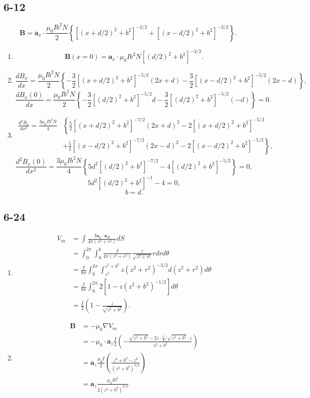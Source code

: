 \documentclass[11pt,a4paper]{article}
\begin{document}
\subsection{6-12}
$$\mathbf{B}=\mathbf{a}_x\cdot\frac{\mu_0Ib^2N}{2}\left\{[(x+d/2)^2+b^2]^{-3/2}+[(x-d/2)^2+b^2]^{-3/2}\right\}.$$
\begin{enumerate}[label=\alph*)]
\item
$$\mathbf{B}(x=0)=\mathbf{a}_x\cdot\mu_0Ib^2N[(d/2)^2+b^2]^{-3/2}.$$
\item
$$\frac{dB_x}{dx}=\frac{\mu_0Ib^2N}{2}\left\{-\frac{3}{2}[(x+d/2)^2+b^2]^{-5/2}(2x+d)-\frac{3}{2}[(x-d/2)^2+b^2]^{-5/2}(2x-d)\right\},$$
$$\frac{dB_x(0)}{dx}=\frac{\mu_0Ib^2N}{2}\left\{-\frac{3}{2}[(d/2)^2+b^2]^{-5/2}d-\frac{3}{2}[(d/2)^2+b^2]^{-5/2}(-d)\right\}=0.$$
\item
\begin{align*}
\frac{d^2B_x}{dx^2}=\frac{3\mu_0Ib^2N}{4}&\left\{\frac{5}{2}[(x+d/2)^2+b^2]^{-7/2}(2x+d)^2-2[(x+d/2)^2+b^2]^{-5/2}\right.\\
&\left.+\frac{5}{2}[(x-d/2)^2+b^2]^{-7/2}(2x-d)^2-2[(x-d/2)^2+b^2]^{-5/2}\right\},
\end{align*}
$$\frac{d^2B_x(0)}{dx^2}=\frac{3\mu_0Ib^2N}{4}\left\{5d^2[(d/2)^2+b^2]^{-7/2}-4[(d/2)^2+b^2]^{-5/2}\right\}=0,$$
$$5d^2[(d/2)^2+b^2]^{-1}-4=0,$$
$$b=d.$$
\end{enumerate}

\subsection{6-24}
\begin{enumerate}[label=\alph*)]
\item
\begin{align*}
V_m&=\int\frac{I\mathbf{a}_n\cdot\mathbf{a}_R}{4\pi(z^2+r^2)} dS\\
&=\int_0^{2\pi}\int_0^b \frac{I}{4\pi(z^2+r^2)}\frac{z}{\sqrt{z^2+r^2}}rdrd\theta\\
&=\frac{I}{8\pi}\int_0^{2\pi}\int_{z^2}^{z^2+b^2}z(z^2+r^2)^{-3/2}d(z^2+r^2)d\theta\\
&=\frac{I}{8\pi}\int_0^{2\pi}2[1-z(z^2+b^2)^{-1/2}]d\theta\\
&=\frac{I}{2}\left(1-\frac{z}{\sqrt{z^2+b^2}}\right).
\end{align*}
\item
\begin{align*}
\mathbf{B}&=-\mu_0\nabla V_m\\
&=-\mu_0\cdot\mathbf{a}_z\frac{I}{2}\left(-\frac{\sqrt{z^2+b^2}-2z\cdot\frac{1}{2}/\sqrt{z^2+b^2}\cdot z}{z^2+b^2}\right)\\
&=\mathbf{a}_z\frac{\mu_0I}{2}\left(\frac{z^2+b^2-z^2}{(z^2+b^2)^{3/2}}\right)\\
&=\mathbf{a}_z\frac{\mu_0Ib^2}{2(z^2+b^2)^{3/2}}.
\end{align*}
\end{enumerate}
\end{document}
